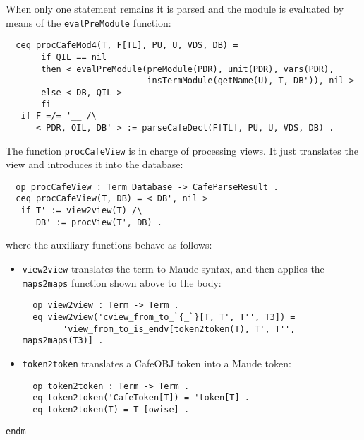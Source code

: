 When only one statement remains it is parsed and the module is evaluated by means
of the \verb"evalPreModule" function:

{\codesize
\begin{verbatim}
  ceq procCafeMod4(T, F[TL], PU, U, VDS, DB) =
       if QIL == nil
       then < evalPreModule(preModule(PDR), unit(PDR), vars(PDR),
                            insTermModule(getName(U), T, DB')), nil >
       else < DB, QIL >
       fi
   if F =/= '__ /\
      < PDR, QIL, DB' > := parseCafeDecl(F[TL], PU, U, VDS, DB) .
\end{verbatim}
}

The function \verb"procCafeView" is in charge of processing views. It just
translates the view and introduces it into the database:

{\codesize
\begin{verbatim}
  op procCafeView : Term Database -> CafeParseResult .
  ceq procCafeView(T, DB) = < DB', nil >
   if T' := view2view(T) /\
      DB' := procView(T', DB) .
\end{verbatim}
}

\noindent
where the auxiliary functions behave as follows:
\begin{itemize}
\item
\verb"view2view" translates the term to Maude syntax, and then applies
the \verb"maps2maps" function shown above to the body:

{\codesize
\begin{verbatim}
  op view2view : Term -> Term .
  eq view2view('cview_from_to_`{_`}[T, T', T'', T3]) =
        'view_from_to_is_endv[token2token(T), T', T'', maps2maps(T3)] .
\end{verbatim}
}

\item
\verb"token2token" translates a CafeOBJ token into a Maude token:

{\codesize
\begin{verbatim}
  op token2token : Term -> Term .
  eq token2token('CafeToken[T]) = 'token[T] .
  eq token2token(T) = T [owise] .
\end{verbatim}
}
\end{itemize}

{\codesize
\begin{comment}
  op openCloseModName : -> Constant .
  eq openCloseModName = ''OPEN_CLOSE.Qid .

  op procOpenCloseEnv : Term Term Database -> CafeParseResult .
  ceq procOpenCloseEnv(T, T', DB) = < PDR, QIL, DB' >
   if T1 := 'CafeToken[openCloseModName] /\
      T2 := '__['inc`(_`)[T], T'] /\
      < PDR, QIL, DB' > := procCafeMod('cmod!_`{_`}[T1, T2], DB) .
\end{comment}
}
{\codesize
\begin{verbatim}
endm
\end{verbatim}
}

